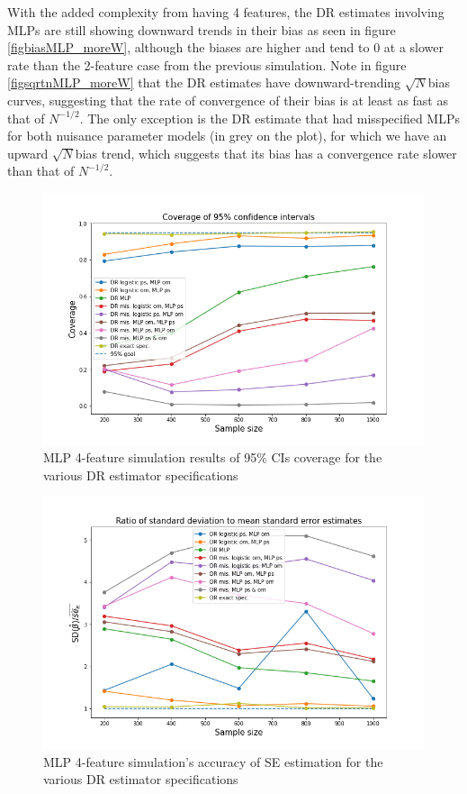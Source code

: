 \documentclass[12pt,twoside]{article}
\begin{document}
With the added complexity from having 4 features, the DR estimates involving MLPs are still showing downward trends in their bias as seen in figure \ref{figbiasMLP_moreW}, although the biases are higher and tend to 0 at a slower rate than the 2-feature case from the previous simulation. Note in figure \ref{figsqrtnMLP_moreW} that the DR estimates have downward-trending $\sqrt{N}$bias curves, suggesting that the rate of convergence of their bias is at least as fast as that of $N^{-1/2}$. The only exception is the DR estimate that had misspecified MLPs for both nuisance parameter models (in grey on the plot), for which we have an upward $\sqrt{N}$bias trend, which suggests that its bias has a convergence rate slower than that of $N^{-1/2}$.

\begin{figure}[h!]
    \centering
    \includegraphics[width = 0.9\columnwidth]{figures/CIMLP_moreW.png}
    \caption{MLP 4-feature simulation results of 95\% CIs coverage for the various DR estimator specifications}
    \label{figCIMLP_moreW}
\end{figure}

\begin{figure}[h!]
    \centering
    \includegraphics[width = 0.9\columnwidth]{figures/SEMLP_moreW.png}
    \caption{MLP 4-feature simulation's accuracy of \citet{lunceford_davidian} SE estimation for the various DR estimator specifications}
    \label{figSEMLP_moreW}
\end{figure}
\end{document}
